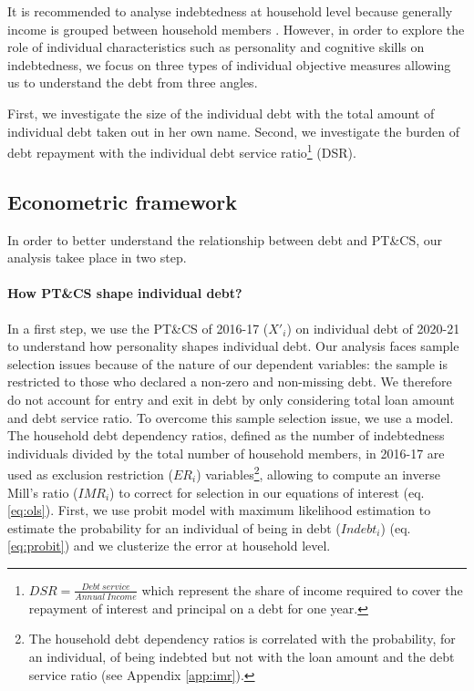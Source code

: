 \documentclass[a4paper, 11pt, onecolumn]{article}
\begin{document}
It is recommended to analyse indebtedness at household level because generally income is grouped between household members \citep{European2010}.
However, in order to explore the role of individual characteristics such as personality and cognitive skills on indebtedness, we focus on three types of individual objective measures allowing us to understand the debt from three angles.

First, we investigate the size of the individual debt with the total amount of individual debt taken out in her own name.
Second, we investigate the burden of debt repayment with the individual debt service ratio\footnote{$DSR=\frac{Debt~service}{Annual~Income}$ which represent the share of income required to cover the repayment of interest and principal on a debt for one year.} (DSR).




	\subsection{Econometric framework}
	\label{subsection:econometricframework}

In order to better understand the relationship between debt and PT\&CS, our analysis takee place in two step.
\paragraph{How PT\&CS shape individual debt?}
In a first step, we use the PT\&CS of 2016-17 ($X'_{i}$) on individual debt of 2020-21 to understand how personality shapes individual debt.
Our analysis faces sample selection issues because of the nature of our dependent variables: the sample is restricted to those who declared a non-zero and non-missing debt.
We therefore do not account for entry and exit in debt by only considering total loan amount and debt service ratio.
To overcome this sample selection issue, we use a \cite{Heckman1976} model.
The household debt dependency ratios, defined as the number of indebtedness individuals divided by the total number of household members, in 2016-17 are used as exclusion restriction ($ER_{i}$) variables\footnote{The household debt dependency ratios is correlated with the probability, for an individual, of being indebted but not with the loan amount and the debt service ratio (see Appendix \ref{app:imr}).}, allowing to compute an inverse Mill’s ratio ($IMR_{i}$) to correct for selection in our equations of interest (eq. \ref{eq:ols}).
First, we use probit model with maximum likelihood estimation to estimate the probability for an individual of being in debt ($Indebt_{i}$) (eq. \ref{eq:probit}) and we clusterize the error at household level.
\end{document}
